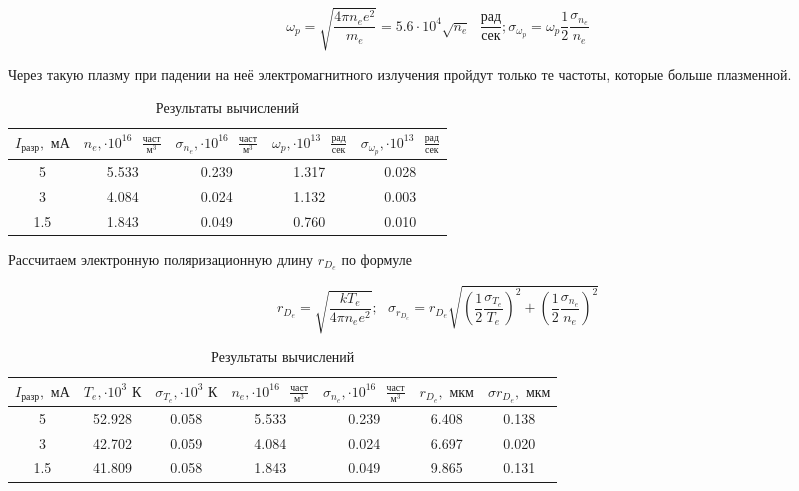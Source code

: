 \documentclass[a4paper,12pt]{article} %
\begin{document}
\begin{enumerate}
    \[ \omega_{p} = \sqrt{\frac{4\pi n_e e^2}{m_e}} = 5.6\cdot 10^{4}\sqrt{n_e} \text{ }\frac{\text{рад}}{\text{сек}};  \sigma_{\omega_p} = \omega_p \frac{1}{2}\frac{\sigma_{n_e}}{n_e} \]

    Через такую плазму при падении на неё электромагнитного излучения пройдут только те частоты, которые больше плазменной.

    \begin{table}[h]
	\centering
	\begin{tabular}{|c|c|c|c|c|}
            \hline
            $I_{\text{разр}}, \text{ мА}$ & $n_e, \cdot 10^{16} \text{ }\frac{\text{част}}{\text{м}^3}$ & $\sigma_{n_e}, \cdot 10^{16} \text{ }\frac{\text{част}}{\text{м}^3}$ & $\omega_{p}, \cdot 10^{13} \text{ }\frac{\text{рад}}{\text{сек}}$ & $\sigma_{\omega_{p}}, \cdot 10^{13} \text{ }\frac{\text{рад}}{\text{сек}}$  \\ \hline
            5 & 5.533 & 0.239 & 1.317 & 0.028 \\ \hline
            3 & 4.084 & 0.024 & 1.132 & 0.003 \\ \hline
            1.5 & 1.843 & 0.049 & 0.760 & 0.010 \\ \hline
	\end{tabular}
	\caption{Результаты вычислений}
	\label{tab7}
    \end{table}

    Рассчитаем электронную поляризационную длину $r_{D_e}$ по формуле

    \[ r_{D_e }= \sqrt{\frac{kT_e}{4\pi n_e e^2}}; \text{ } \sigma_{r_{D_e}} = r_{D_e} \sqrt{\left(\frac{1}{2}\frac{\sigma_{T_e}}{T_e}\right)^2 + \left(\frac{1}{2}\frac{\sigma_{n_e}}{n_e}\right)^2 } \]

    \begin{table}[h]
	\centering
	\begin{tabular}{|c|c|c|c|c|c|c|}
            \hline
            $I_{\text{разр}}, \text{ мА}$ & $T_e, \cdot 10^3 \text{ К}$ & $\sigma_{T_e}, \cdot 10^3 \text{ К}$ & $n_e, \cdot 10^{16} \text{ }\frac{\text{част}}{\text{м}^3}$ & $\sigma_{n_e}, \cdot 10^{16} \text{ }\frac{\text{част}}{\text{м}^3}$ & $ r_{D_e}, \text{ мкм}$ & $ \sigma{r_{D_e}}, \text{ мкм}$  \\ \hline
            5 &  52.928 & 0.058 & 5.533 & 0.239 & 6.408 & 0.138 \\ \hline
            3 &  42.702 & 0.059 & 4.084 & 0.024 & 6.697 & 0.020 \\ \hline
            1.5 & 41.809 & 0.058 & 1.843 & 0.049 & 9.865 & 0.131 \\ \hline
	\end{tabular}
	\caption{Результаты вычислений}
	\label{tab8}
    \end{table}


\end{enumerate}
\end{document}
